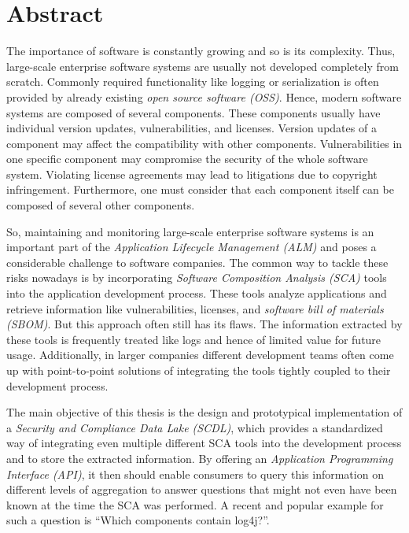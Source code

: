 
\titlespacing*{\chapter}{0pt}{0pt}{40pt}
\pagestyle{plain}
\chapter*{Abstract}
The importance of software is constantly growing and so is its complexity. Thus, large-scale enterprise software systems are usually not developed completely from scratch. Commonly required functionality like logging or serialization is often provided by already existing \textit{open source software (OSS)}. Hence, modern software systems are composed of several components. These components usually have individual version updates, vulnerabilities, and licenses. Version updates of a component may affect the compatibility with other components. Vulnerabilities in one specific component may compromise the security of the whole software system. Violating license agreements may lead to litigations due to copyright infringement. Furthermore, one must consider that each component itself can be composed of several other components.\par
So, maintaining and monitoring large-scale enterprise software systems is an important part of the \textit{Application Lifecycle Management (ALM)} and poses a considerable challenge to software companies. The common way to tackle these risks nowadays is by incorporating \textit{Software Composition Analysis (SCA)} tools into the application development process. These tools analyze applications and retrieve information like vulnerabilities, licenses, and \textit{software bill of materials (SBOM)}. But this approach often still has its flaws. The information extracted by these tools is frequently treated like logs and hence of limited value for future usage. Additionally, in larger companies different development teams often come up with point-to-point solutions of integrating the tools tightly coupled to their development process.\par
The main objective of this thesis is the design and prototypical implementation of a \textit{Security and Compliance Data Lake (SCDL)}, which provides a standardized way of integrating even multiple different SCA tools into the development process and to store the extracted information. By offering an \textit{Application Programming Interface (API)}, it then should enable consumers to query this information on different levels of aggregation to answer questions that might not even have been known at the time the SCA was performed. A recent and popular example for such a question is \enquote{Which components contain log4j?}.\par
